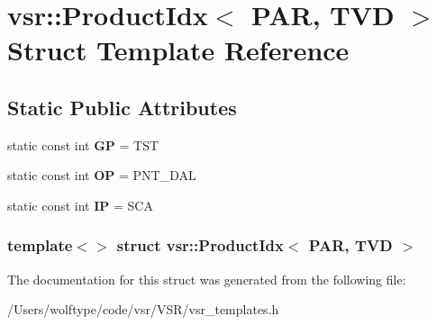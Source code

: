 \hypertarget{structvsr_1_1_product_idx_3_01_p_a_r_00_01_t_v_d_01_4}{\section{vsr\-:\-:Product\-Idx$<$ P\-A\-R, T\-V\-D $>$ Struct Template Reference}
\label{structvsr_1_1_product_idx_3_01_p_a_r_00_01_t_v_d_01_4}
}
\subsection*{Static Public Attributes}
\begin{DoxyCompactItemize}
\item 
\hypertarget{structvsr_1_1_product_idx_3_01_p_a_r_00_01_t_v_d_01_4_a080e8edeeea7b46a863b0c45e32cb3e5}{static const int {\bfseries G\-P} = T\-S\-T}\label{structvsr_1_1_product_idx_3_01_p_a_r_00_01_t_v_d_01_4_a080e8edeeea7b46a863b0c45e32cb3e5}

\item 
\hypertarget{structvsr_1_1_product_idx_3_01_p_a_r_00_01_t_v_d_01_4_a7848a32f38319d386dfc6ae27d4e34ac}{static const int {\bfseries O\-P} = P\-N\-T\-\_\-\-D\-A\-L}\label{structvsr_1_1_product_idx_3_01_p_a_r_00_01_t_v_d_01_4_a7848a32f38319d386dfc6ae27d4e34ac}

\item 
\hypertarget{structvsr_1_1_product_idx_3_01_p_a_r_00_01_t_v_d_01_4_a17f94c9e621775697d16bd6c5b4021c3}{static const int {\bfseries I\-P} = S\-C\-A}\label{structvsr_1_1_product_idx_3_01_p_a_r_00_01_t_v_d_01_4_a17f94c9e621775697d16bd6c5b4021c3}

\end{DoxyCompactItemize}
\subsubsection*{template$<$$>$ struct vsr\-::\-Product\-Idx$<$ P\-A\-R, T\-V\-D $>$}



The documentation for this struct was generated from the following file\-:\begin{DoxyCompactItemize}
\item 
/\-Users/wolftype/code/vsr/\-V\-S\-R/vsr\-\_\-templates.\-h\end{DoxyCompactItemize}
